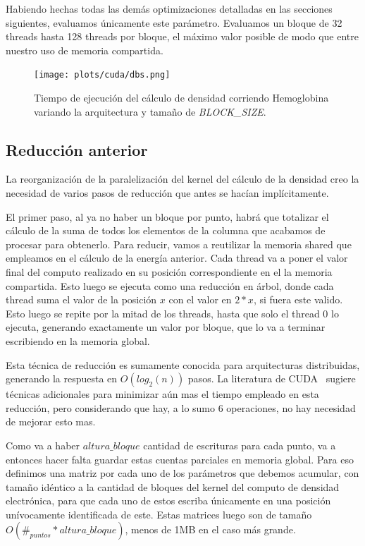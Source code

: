 Habiendo hechas todas las dem\'as optimizaciones detalladas en las secciones siguientes, evaluamos
\'unicamente este par\'ametro. Evaluamos un bloque de 32 threads hasta 128 threads por bloque,
el m\'aximo valor posible de modo que entre nuestro uso de memoria compartida.

\begin{figure}[htbp]
   \centering
   \texttt{[image: plots/cuda/dbs.png]}
   \caption{Tiempo de ejecuci\'on del c\'alculo de densidad corriendo Hemoglobina variando
   la arquitectura y tama\~no de \textit{BLOCK\_SIZE}.}
   \label{fig:dbs-runtime}
\end{figure}


\subsection{Reducci\'on anterior}
La reorganizaci\'on de la paralelizaci\'on del kernel del c\'alculo de la densidad creo la necesidad
de varios pasos de reducci\'on que antes se hac\'ian impl\'icitamente.

El primer paso, al ya no haber un bloque por punto, habr\'a que totalizar el c\'alculo de la
suma de todos los elementos de la columna que acabamos de procesar para obtenerlo. Para reducir,
vamos a reutilizar la memoria shared que empleamos en el c\'alculo de la energ\'ia anterior. Cada
thread va a poner el valor final del computo realizado en su posici\'on correspondiente en el
la memoria compartida. Esto luego se ejecuta como una reducci\'on en \'arbol, donde cada
thread suma el valor de la posici\'on $x$ con el valor en $2*x$, si fuera este valido. Esto
luego se repite por la mitad de los threads, hasta que solo el thread 0 lo ejecuta,
generando exactamente un valor por bloque, que lo va a terminar escribiendo en la memoria
global.

Esta t\'ecnica de reducci\'on es sumamente conocida para arquitecturas distribuidas, generando
la respuesta en $O(log_2(n))$ pasos. La literatura de CUDA~\cite{cudaReductions} sugiere t\'ecnicas adicionales para
minimizar a\'un mas el tiempo empleado en esta reducci\'on, pero considerando que hay, a lo sumo
6 operaciones, no hay necesidad de mejorar esto mas.

Como va a haber $altura\_bloque$ cantidad de escrituras para cada punto, va a entonces
hacer falta guardar estas cuentas parciales en memoria global. Para eso definimos una matriz
por cada uno de los par\'ametros que debemos acumular, con tama\~no id\'entico a la cantidad de bloques
del kernel del computo de densidad electr\'onica, para que cada uno de estos escriba \'unicamente en una posici\'on
un\'ivocamente identificada de este. Estas matrices luego son de tama\~no $O(\#_{puntos} * altura\_bloque)$,
menos de 1MB en el caso m\'as grande.


